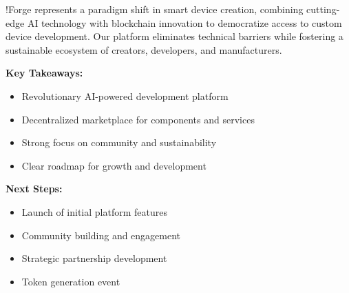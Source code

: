 \vspace{0.5cm}
\noindent !Forge represents a paradigm shift in smart device creation, combining cutting-edge AI technology with blockchain innovation to democratize access to custom device development. Our platform eliminates technical barriers while fostering a sustainable ecosystem of creators, developers, and manufacturers.

\vspace{0.5cm}
\noindent\textbf{Key Takeaways:}
\begin{itemize}[leftmargin=*]
    \item Revolutionary AI-powered development platform
    \item Decentralized marketplace for components and services
    \item Strong focus on community and sustainability
    \item Clear roadmap for growth and development
\end{itemize}

\vspace{0.5cm}
\noindent\textbf{Next Steps:}
\begin{itemize}[leftmargin=*]
    \item Launch of initial platform features
    \item Community building and engagement
    \item Strategic partnership development
    \item Token generation event
\end{itemize}